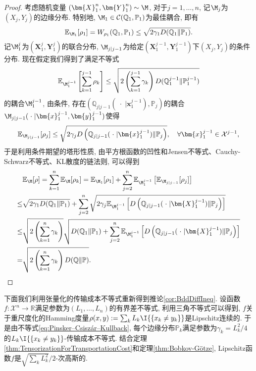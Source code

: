 \begin{proof}
	考虑随机变量 $(\bm{X}_1^n, \bm{Y}_1^n) \sim \M$, 对于$j = 1, \dots, n$, 记$\M_j$为$(X_j, Y_j)$的边缘分布. 
	特别地, $\M_1 \in \mathcal{C}(\mathbb{Q}_1, \mathbb{P}_1)$为最佳耦合, 即有
	\begin{equation*}
		\mathbb{E}_{\M_1} [\rho_1] = W_{\rho_1} (\mathbb{Q}_1, \mathbb{P}_1) \leq \sqrt{2 \gamma_1 D(\mathbb{Q}_1 \| \mathbb{P}_1)}. 
	\end{equation*}
	记$\M_1^j$为$(\bm{X}_1^j, \bm{Y}_1^j)$的联合分布, $\M_{j | j-1}$为给定$(\bm{X}_1^{j-1}, \bm{Y}_1^{j-1})$下$(X_j, Y_j)$的条件分布. 
	现在假定我们得到了满足不等式
	\begin{equation*}
		\mathbb{E}_{\M_1^{j-1}} \left[\sum_{k=1}^{j-1} \rho_k \right]
		\leq \sqrt{2 \left(\sum_{k=1}^{j-1} \gamma_k \right) D(\mathbb{Q}_1^{j-1} \| \mathbb{P}_1^{j-1})}
	\end{equation*}
	的耦合$\M_1^{j-1}$, 由条件, 存在$\left(\mathbb{Q}_{j | j-1}(\;\cdot\; | \bm{x}_1^{j-1}), \mathbb{P}_j\right)$的耦合$\M_{j | j-1}(\;\cdot\; | \bm{x}_1^{j-1}, \bm{y}_1^{j-1})$使得
	\begin{equation*}
		\mathbb{E}_{\M_{j | j-1}}[ \rho_j] 
		\leq \sqrt{2 \gamma_j D\left(\mathbb{Q}_{j | j-1}(\;\cdot\; | \bm{x}_1^{j-1}) \| \mathbb{P}_j\right)}, 
		\quad \forall \bm{x}_1^{j-1} \in \mathcal{X}^{j-1}, 
	\end{equation*}
	于是利用条件期望的塔形性质, 由平方根函数的凹性和Jensen不等式、Cauchy-Schwarz不等式、KL散度的链法则, 可以得到
	\begin{align*}
		& \mathbb{E}_{\M}[\rho]
		= \sum_{k=1}^n \mathbb{E}_{\M}[ \rho_k]
		= \mathbb{E}_{\M_1}[\rho_1] + \sum_{j=2}^n \mathbb{E}_{\M_1^{j-1}} \left[ \mathbb{E}_{\M_{j | j-1}} [\rho_j] \right] \\
		\leq & \sqrt{2 \gamma_1 D(\mathbb{Q}_1 \| \mathbb{P}_1)} + \sum_{j=2}^n \sqrt{2 \gamma_j \mathbb{E}_{\M_1^{j-1}} \left[ D\left(\mathbb{Q}_{j | j-1}(\;\cdot\; | \bm{X}_1^{j-1}) \| \mathbb{P}_j\right) \right]} \\
		\leq & \sqrt{2 \left(\sum_{k=1}^n \gamma_k \right)} \sqrt{D(\mathbb{Q}_1 \| \mathbb{P}_1) + \sum_{j=2}^n \mathbb{E}_{\M_1^{j-1}} \left[ D\left(\mathbb{Q}_{j | j-1}(\;\cdot\; | \bm{X}_1^{j-1}) \| \mathbb{P}_j\right) \right]} \\
		= & \sqrt{2 \left(\sum_{k=1}^n \gamma_k \right) D(\mathbb{Q} \| \mathbb{P})}. 
	\end{align*}
\end{proof}

 
\begin{example}[有界差不等式']
	下面我们利用张量化的传输成本不等式重新得到推论\ref{cor:BddDiffIneq}.
	设函数$f \colon \mathcal{X}^n \to \mathbb{R}$满足参数为$(L_1, \dots, L_n)$的有界差不等式, 利用三角不等式可以得到, $f$关于重尺度化的Hamming度量$\rho(x, y) := \sum_k L_k \I{\{x_k \neq y_k\}}$是Lipschitz连续的. 
	于是由不等式\ref{eq:Pinsker–Csiszár–Kullback}, 每个边缘分布$\mathbb{P}_k$满足参数为$\gamma_k = L_k^2 / 4$的$L_k \I{\{x_k \neq y_k\}}$-传输成本不等式. 
	结合定理\ref{thm:TensorizationForTransportationCost}和定理\ref{thm:Bobkov-Götze}, Lipschitz函数$f$是$\sqrt{\sum_k L_k^2} / 2$-次高斯的. 
\end{example}


